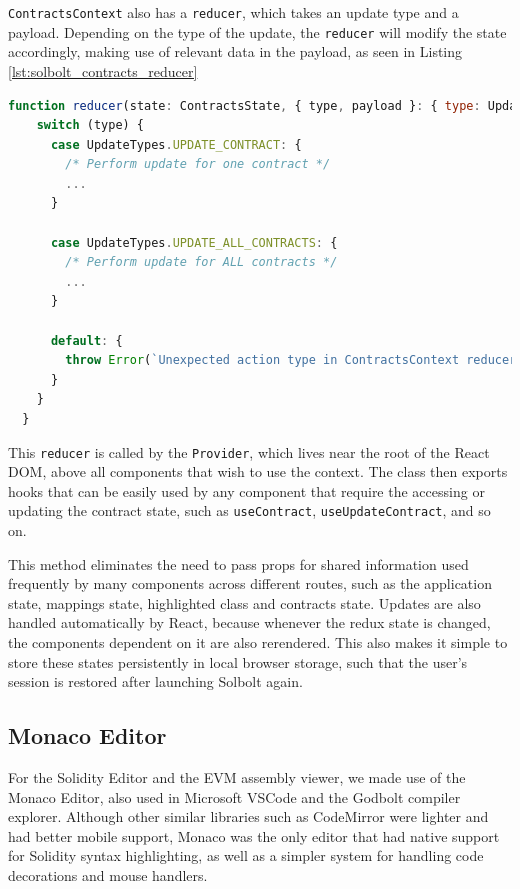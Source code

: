 \texttt{ContractsContext} also has a \texttt{reducer}, which takes an update type and a payload.
Depending on the type of the update, the \texttt{reducer} will modify the state accordingly,
making use of relevant data in the payload, as seen in Listing \ref{lst:solbolt_contracts_reducer}

\begin{lstlisting}[language=Javascript, caption={Reducer used in \texttt{ContractsContext}}, label={lst:solbolt_contracts_reducer}, basicstyle=\ttfamily\scriptsize]
  function reducer(state: ContractsState, { type, payload }: { type: UpdateTypes, payload: PayloadType | undefined}) {
    switch (type) {
      case UpdateTypes.UPDATE_CONTRACT: {
        /* Perform update for one contract */
        ...
      }

      case UpdateTypes.UPDATE_ALL_CONTRACTS: {
        /* Perform update for ALL contracts */
        ...
      }

      default: {
        throw Error(`Unexpected action type in ContractsContext reducer: '${type}'.`)
      }
    }
  }
\end{lstlisting}

This \texttt{reducer} is called by the \texttt{Provider}, which lives near the root of
the React DOM, above all components that wish to use the context. The class then exports
hooks that can be easily used by any component that require the accessing or updating 
the contract state, such as \texttt{useContract}, \texttt{useUpdateContract}, and so on.

This method eliminates the need to pass props for shared information used frequently by many
components across different routes, such as the application state, mappings state, highlighted class and
contracts state. Updates are also handled automatically by React, because whenever the 
redux state is changed, the components dependent on it are also rerendered.
This also makes it simple to store these states persistently in local
browser storage, such that the user's session is restored after launching Solbolt again.

\subsection{Monaco Editor}

For the Solidity Editor and the EVM assembly viewer, we made use of the Monaco Editor,
also used in Microsoft VSCode and the Godbolt compiler explorer.
Although other similar libraries such as CodeMirror were lighter and had better mobile
support, Monaco was the only editor that had native support for Solidity syntax highlighting, 
as well as a simpler system for handling code decorations and mouse handlers. 

